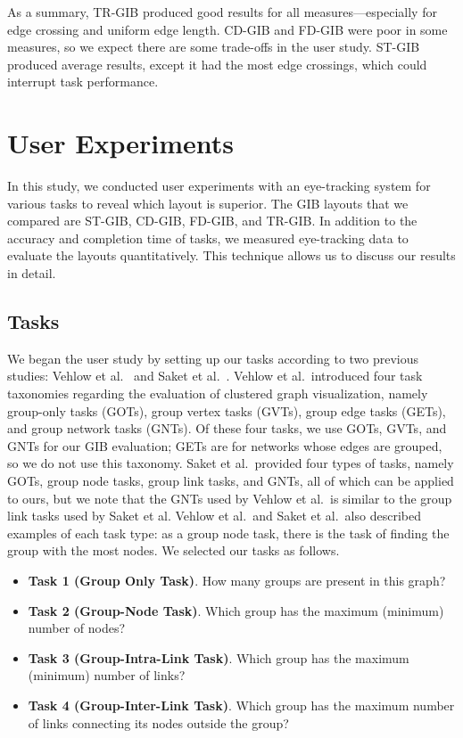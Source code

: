 \documentclass[review]{vgtc}                 %
\begin{document}
As a summary, TR-GIB produced good results for all measures---especially for edge crossing and uniform edge length.
CD-GIB and FD-GIB were poor in some measures, so we expect there are some trade-offs in the user study.
ST-GIB produced average results, except it had the most edge crossings, which could interrupt task performance.

%
\section{User Experiments}
%
In this study, we conducted user experiments with an eye-tracking system for various tasks to reveal which layout is superior.
The GIB layouts that we compared are ST-GIB, CD-GIB, FD-GIB, and TR-GIB.
In addition to the accuracy and completion time of tasks, we measured eye-tracking data to evaluate the layouts quantitatively.
This technique allows us to discuss our results in detail.


\subsection{Tasks}
\label{task}
We began the user study by setting up our tasks according to two previous studies: Vehlow et al.~\cite{Vehlow2017VisualizingGS} and Saket et al.~\cite{saket2014group}.
Vehlow et al.\ introduced four task taxonomies regarding the evaluation of clustered graph visualization, namely group-only tasks (GOTs), group vertex tasks (GVTs), group edge tasks (GETs), and group network tasks (GNTs).
Of these four tasks, we use GOTs, GVTs, and GNTs for our GIB evaluation; GETs are for networks whose edges are grouped, so we do not use this taxonomy.
Saket et al.\ provided four types of tasks, namely GOTs, group node tasks, group link tasks, and GNTs, all of which can be applied to ours, but we note that the GNTs used by Vehlow et al.\ is similar to the group link tasks used by Saket et al.
Vehlow et al.\ and Saket et al.\ also described examples of each task type: as a group node task, there is the task of finding the group with the most nodes.
We selected our tasks as follows.

\begin{itemize}
\item {\bf Task 1 (Group Only Task)}. How many groups are present in this graph?
\item {\bf Task 2 (Group-Node Task)}. Which group has the maximum (minimum) number of nodes?
\item {\bf Task 3 (Group-Intra-Link Task)}. Which group has the maximum (minimum) number of links?
\item {\bf Task 4 (Group-Inter-Link Task)}. Which group has the maximum number of links connecting its nodes outside the group?
\end{itemize}
\end{document}
